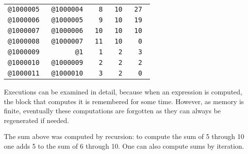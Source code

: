 \documentclass[12pt]{article}
\newenvironment{indpar}[1][0.3in]%
	{\begin{list}{}%
		     {\setlength{\itemsep}{0in}%
		      \setlength{\topsep}{0in}%
		      \setlength{\parsep}{1ex}%
		      \setlength{\labelwidth}{#1}%
		      \setlength{\leftmargin}{#1}%
		      \addtolength{\leftmargin}{\labelsep}}%
	 \item}%
	{\end{list}}
\begin{document}
\begin{indpar}
\begin{tabular}{|r|r|r|r|r|}
\tt @1000005 & \tt @1000004	& \tt 8		& \tt	10	& \tt 27 \\
\tt @1000006 & \tt @1000005	& \tt 9		& \tt	10	& \tt 19 \\
\tt @1000007 & \tt @1000006	& \tt 10	& \tt	10	& \tt 10 \\
\tt @1000008 & \tt @1000007	& \tt 11	& \tt	10	& \tt 0 \\
\tt @1000009 & \tt @1		& \tt 1		& \tt	2	& \tt 3 \\
\tt @1000010 & \tt @1000009	& \tt 2		& \tt	2	& \tt 2 \\
\tt @1000011 & \tt @1000010	& \tt 3		& \tt	2	& \tt 0 \\
\hline
\end{tabular}
\end{indpar}

Executions can be examined in detail, because
when an expression is computed, the block that computes it is remembered
for some time.  However, as memory is finite, eventually these
computations are forgotten as they can always be regenerated if
needed.

The sum above was computed by recursion: to compute the sum of 5 through 10
one adds 5 to the sum of 6 through 10.  One can also compute sums by
iteration.
\end{document}

